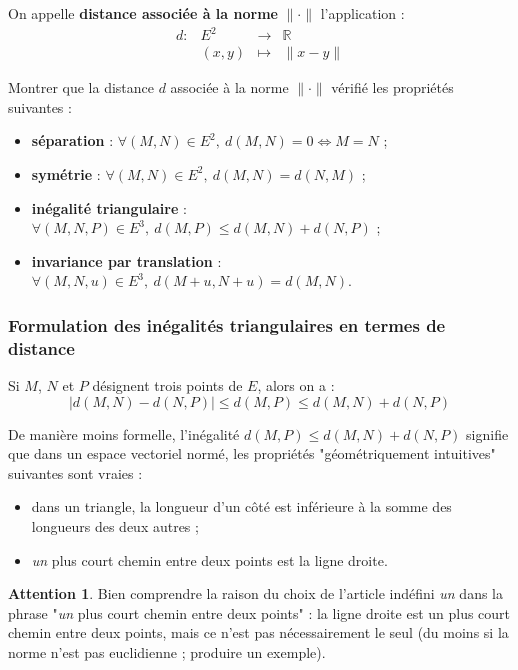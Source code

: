 \documentclass[french]{article}
\newcommand{\R}{\mathbb{R}}
\theoremstyle{plain}
\theoremstyle{definition}
\newtheorem*{attention}{Attention}
\theoremstyle{remark}
\begin{document}
\begin{dfn}
	On appelle \textbf{distance associée à la norme} $\lVert\cdot\rVert$ l'application : $$\begin{array}{lrcl}
		d:&E^2&\longrightarrow&\R\\
		&(x,y)&\longmapsto&\lVert x-y\rVert
	\end{array}$$
\end{dfn}

\begin{exo}
	Montrer que la distance $d$ associée à la norme $\lVert\cdot\rVert$ vérifié les propriétés suivantes :
	\begin{itemize}
		\item \textbf{séparation} : $\forall (M,N)\in E^2,\ d(M,N)=0\iff M=N$ ;
		\item \textbf{symétrie} : $\forall(M,N)\in E^2,\ d(M,N)=d(N,M)$ ;
		\item \textbf{inégalité triangulaire} : $\forall (M,N,P)\in E^3,\ d(M,P)\leqslant d(M,N)+d(N,P)$ ;
		\item \textbf{invariance par translation} : $\forall (M,N,u)\in E^3,\ d(M+u,N+u)=d(M,N)$.
	\end{itemize}
\end{exo}

\subsubsection*{Formulation des inégalités triangulaires en termes de distance}

\begin{prop}
	Si $M$, $N$ et $P$ désignent trois points de $E$, alors on a : $$\lvert d(M,N)-d(N,P)\rvert\leqslant d(M,P)\leqslant d(M,N)+d(N,P)$$
\end{prop}

De manière moins formelle, l'inégalité $d(M,P)\leqslant d(M,N)+d(N,P)$ signifie que dans un espace vectoriel normé, les propriétés "géométriquement intuitives" suivantes sont vraies :
\begin{itemize}
	\item dans un triangle, la longueur d'un côté est inférieure à la somme des longueurs des deux autres ;
	\item \textit{un} plus court chemin entre deux points est la ligne droite.
\end{itemize}

\begin{attention} 
	Bien comprendre la raison du choix de l'article indéfini \textit{un} dans la phrase "\textit{un} plus court chemin entre deux points" : la ligne droite est un plus court chemin entre deux points, mais ce n'est pas nécessairement le seul (du moins si la norme n'est pas euclidienne ; produire un exemple).
\end{attention}
\end{document}
